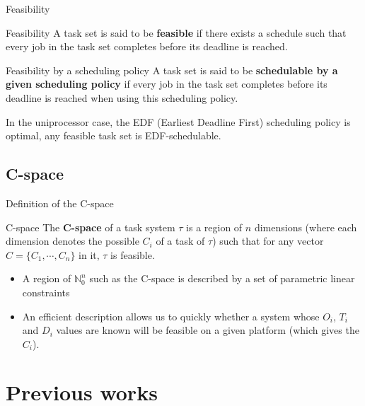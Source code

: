 \documentclass{beamer}
\begin{document}
	\begin{frame}{Feasibility}
		\begin{block}{Feasibility}
        A task set is said to be \textbf{feasible} if there exists a schedule such that every job in the task set completes before its deadline is reached.
        \end{block}

        \begin{block}{Feasibility by a scheduling policy}
        A task set is said to be \textbf{schedulable by a given scheduling policy} if every job in the task set completes before its deadline is reached when using this scheduling policy.
        \end{block}

        In the uniprocessor case, the EDF (Earliest Deadline First) scheduling policy is optimal, any feasible task set is EDF-schedulable.
	\end{frame}

    \subsection{C-space}

    \begin{frame}{Definition of the C-space}
        \begin{block}{C-space}
            The \textbf{C-space} of a task system $\tau$ is a region of $n$ dimensions (where each dimension denotes the possible $C_i$ of a task of $\tau$) such that for any vector $C = \{ C_1, \cdots, C_{n}\}$ in it, $\tau$ is feasible.
        \end{block}

        \begin{itemize}
            \item A region of $\mathbb{N}_0^n$ such as the C-space is described by a set of parametric linear constraints
            \item An efficient description allows us to quickly  whether a system whose $O_i$, $T_i$ and $D_i$ values are known will be feasible on a given platform (which gives the $C_i$).
        \end{itemize}

    \end{frame}

	\section{Previous works}
\end{document}
